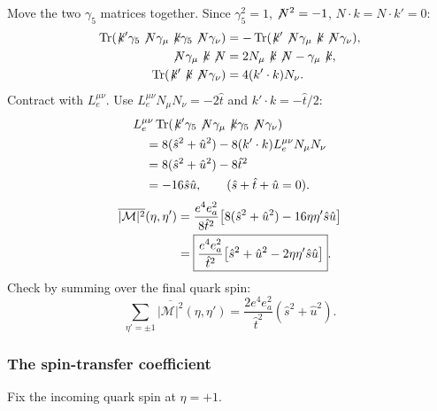 \documentclass[14pt,a4paper]{extarticle}
\numberwithin{equation}{section}
\newcommand{\M}{\mathcal M}
\newcommand{\slsh}[1]{\not\!#1}
\begin{document}
Move the two $\gamma_5$ matrices together. Since $\gamma_5^2=1$, $\slsh N^2=-1$, $N\cdot k=N\cdot k'=0$:
\begin{align}
 \operatorname{Tr}(\slsh{k'}\gamma_5\slsh N\gamma_\mu
                   \slsh k\gamma_5\slsh N\gamma_\nu)
 &=-\operatorname{Tr}(\slsh{k'}\slsh N\gamma_\mu
                      \slsh k\slsh N\gamma_\nu),\\
 \slsh N\gamma_\mu\slsh k\slsh N
 &=2N_\mu\slsh k\slsh N-\gamma_\mu\slsh k,\\
 \operatorname{Tr}(\slsh{k'}\slsh k\slsh N\gamma_\nu)
 &=4(k'\cdot k)N_\nu.
\end{align}
Contract with $L_e^{\mu\nu}$. Use
$L_e^{\mu\nu}N_\mu N_\nu=-2\hat t$ and
$k'\cdot k=-\hat t/2$:
\begin{align}
 &L_e^{\mu\nu}
 \operatorname{Tr}(\slsh{k'}\gamma_5\slsh N\gamma_\mu
                   \slsh k\gamma_5\slsh N\gamma_\nu)\notag\\
 &\quad=8(\hat s^2+\hat u^2)
       -8(k'\cdot k)L_e^{\mu\nu}N_\mu N_\nu\notag\\
 &\quad=8(\hat s^2+\hat u^2)-8\hat t^2\notag\\
 &\quad=-16\hat s\hat u,
 \qquad(\hat s+\hat t+\hat u=0).
\end{align}
\begin{align}
 \overline{|\M|^2}(\eta,\eta')
 &=\frac{e^4e_a^2}{8\hat t^2}
   \bigl[8(\hat s^2+\hat u^2)
         -16\eta\eta'\hat s\hat u\bigr]\notag\\
 &=\boxed{\frac{e^4e_a^2}{\hat t^2}
   \bigl[\hat s^2+\hat u^2-2\eta\eta'\hat s\hat u\bigr]}.
\end{align}
Check by summing over the final quark spin:
\begin{equation}
 \sum_{\eta'=\pm1}\overline{|\M|^2}(\eta,\eta')
 =\frac{2e^4e_a^2}{\hat t^2}(\hat s^2+\hat u^2).
\end{equation}
\subsubsection{The spin-transfer coefficient}
Fix the incoming quark spin at $\eta=+1$.
\end{document}
